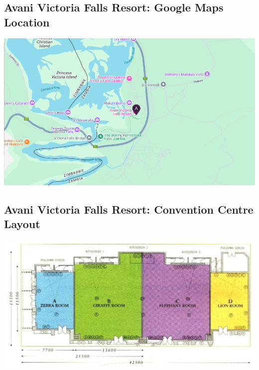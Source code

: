 \subsection{Avani Victoria Falls Resort: Google Maps Location}

\begin{center}
\includegraphics[width=\linewidth]{images/img-etd24-avani_victoria_fall_convention_centre_map.png}
\end{center}


\subsection{Avani Victoria Falls Resort: Convention Centre Layout}

\begin{center}
\includegraphics[width=\linewidth]{images/img-etd24-avani_victoria_fall_convention_centre_layout.png}
\end{center}
